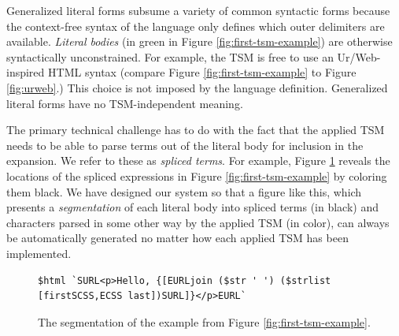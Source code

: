Generalized literal forms subsume a variety of common syntactic forms because the context-free syntax of the language only defines which outer delimiters are available. \emph{Literal bodies} (in green in Figure \ref{fig:first-tsm-example}) are otherwise syntactically unconstrained. For example, the  TSM is free to use an Ur/Web-inspired HTML syntax (compare Figure \ref{fig:first-tsm-example} to Figure \ref{fig:urweb}.) This choice is not imposed by the language definition. Generalized literal forms have no TSM-independent meaning.


The primary technical challenge has to do with the fact that the applied TSM needs to be able to parse terms out of the literal body for inclusion in the expansion. We refer to these as \emph{spliced terms}. For example, Figure \ref{fig:first-tsm-example-marked} reveals the locations of the spliced expressions in Figure \ref{fig:first-tsm-example} by coloring them black. We have designed our system so that a figure like this, which presents a \emph{segmentation} of each literal body into spliced terms (in black) and characters parsed in some other way by the applied TSM (in color), can always be automatically generated no matter how each applied TSM has been implemented. 

\begin{figure}[h]
\begin{lstlisting}[numbers=none,xleftmargin=0px]
$html `SURL<p>Hello, {[EURLjoin ($str ' ') ($strlist [firstSCSS,ECSS last])SURL]}</p>EURL`
\end{lstlisting}
\caption{The segmentation of the example from Figure \ref{fig:first-tsm-example}.}
\label{fig:first-tsm-example-marked}
\end{figure}

